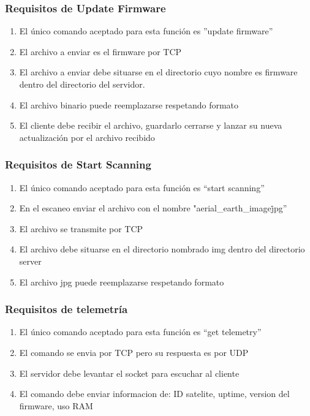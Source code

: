 \documentclass[fontsize=12pt]{article}
\begin{document}
\subsubsection{\textbf{Requisitos de Update Firmware}}
\begin{enumerate}
\item El único comando aceptado para esta función es ''update firmware''
\item El archivo a enviar es el firmware por TCP
\item El archivo a enviar debe situarse en el directorio cuyo nombre es firmware dentro del directorio del servidor. 
\item El archivo binario puede reemplazarse respetando formato 
\item  El cliente debe recibir el archivo, guardarlo cerrarse y lanzar su nueva actualización por el archivo recibido
\end{enumerate}

\subsubsection{\textbf{Requisitos de Start Scanning}}
\begin{enumerate}
\item El único comando aceptado para esta función es “start scanning”
\item En el escaneo enviar el archivo con el nombre "aerial\_earth\_image\.jpg”
\item El archivo se transmite por TCP
\item El archivo debe situarse en el directorio nombrado img dentro del directorio server
\item El archivo jpg puede reemplazarse respetando formato 
\end{enumerate}


\subsubsection{\textbf{Requisitos de telemetría}}
\begin{enumerate}
\item El único comando aceptado para esta función es “get telemetry”
\item El comando se envia por TCP pero su respuesta es por UDP
\item El servidor debe levantar el socket para escuchar al cliente
\item El comando debe enviar informacion de: ID satelite, uptime, version del firmware, uso RAM
\end{enumerate}
\end{document}
